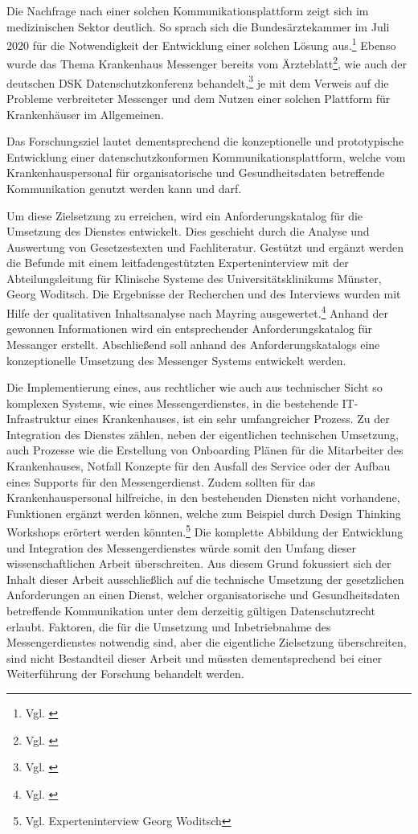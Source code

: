 Die Nachfrage nach einer solchen Kommunikationsplattform zeigt sich im medizinischen Sektor deutlich. So sprach sich die Bundesärztekammer im Juli 2020 für die Notwendigkeit der Entwicklung einer solchen Lösung aus.\footnote{Vgl. \cite[S. 2]{Bundesaerztekammer2020}} Ebenso wurde das Thema Krankenhaus Messenger bereits vom Ärzteblatt\footnote{Vgl. \cite{Giesselmann2018}}, wie auch der deutschen DSK Datenschutzkonferenz behandelt,\footnote{Vgl. \cite[S. 1 ff.]{Datenschutzkonferenz2019}} je mit dem Verweis auf die Probleme verbreiteter Messenger und dem Nutzen einer solchen Plattform für Krankenhäuser im Allgemeinen.

Das Forschungsziel lautet dementsprechend die konzeptionelle und prototypische Entwicklung einer datenschutzkonformen Kommunikationsplattform, welche vom Krankenhauspersonal für organisatorische und Gesundheitsdaten betreffende Kommunikation genutzt werden kann und darf. 

Um diese Zielsetzung zu erreichen, wird ein Anforderungskatalog für die Umsetzung des Dienstes entwickelt. Dies geschieht durch die Analyse und Auswertung von Gesetzestexten und Fachliteratur. Gestützt und ergänzt werden die Befunde mit einem leitfadengestützten Experteninterview mit der Abteilungsleitung für Klinische Systeme des Universitätsklinikums Münster, Georg Woditsch. Die Ergebnisse der Recherchen und des Interviews wurden mit Hilfe der qualitativen Inhaltsanalyse nach Mayring ausgewertet.\footnote{Vgl. \cite[S. 543 ff.]{Baur2014}} Anhand der gewonnen Informationen wird ein entsprechender Anforderungskatalog für Messanger erstellt. Abschließend soll anhand des Anforderungskatalogs eine konzeptionelle Umsetzung des Messenger Systems entwickelt werden.

Die Implementierung eines, aus rechtlicher wie auch aus technischer Sicht so komplexen Systems, wie eines Messengerdienstes, in die bestehende IT-Infrastruktur eines Krankenhauses, ist ein sehr umfangreicher Prozess. Zu der Integration des Dienstes zählen, neben der eigentlichen technischen Umsetzung, auch Prozesse wie die Erstellung von Onboarding Plänen für die Mitarbeiter des Krankenhauses, Notfall Konzepte für den Ausfall des Service oder der Aufbau eines Supports für den Messengerdienst. Zudem sollten für das Krankenhauspersonal hilfreiche, in den bestehenden Diensten nicht vorhandene, Funktionen ergänzt werden können, welche zum Beispiel durch Design Thinking Workshops erörtert werden könnten.\footnote{Vgl. Experteninterview Georg Woditsch} Die komplette Abbildung der Entwicklung und Integration des Messengerdienstes würde somit den Umfang dieser wissenschaftlichen Arbeit überschreiten. Aus diesem Grund fokussiert sich der Inhalt dieser Arbeit ausschließlich auf die technische Umsetzung der gesetzlichen Anforderungen an einen Dienst, welcher organisatorische und Gesundheitsdaten betreffende Kommunikation unter dem derzeitig gültigen Datenschutzrecht erlaubt. Faktoren, die für die Umsetzung und Inbetriebnahme des Messengerdienstes notwendig sind, aber die eigentliche Zielsetzung überschreiten, sind nicht Bestandteil dieser Arbeit und müssten dementsprechend bei einer Weiterführung der Forschung behandelt werden.
